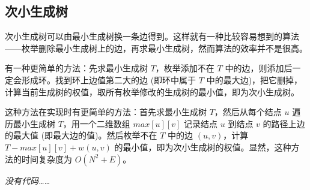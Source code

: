 \subsection{次小生成树}
	次小生成树可以由最小生成树换一条边得到。这样就有一种比较容易想到的算法------枚举删除最小生成树上的边，再求最小生成树，然而算法的效率并不是很高。
	
	有一种更简单的方法：先求最小生成树 $T$，枚举添加不在 $T$ 中的边，则添加后一定会形成环。找到环上边值第二大的边 (即环中属于 $T$ 中的最大边)，把它删掉，计算当前生成树的权值，取所有枚举修改的生成树的最小值，即为次小生成树。
	
	这种方法在实现时有更简单的方法：首先求最小生成树 $T$，然后从每个结点 $u$ 遍历最小生成树 $T$，用一个二维数组 $max[u][v]$ 记录结点 $u$ 到结点 $v$ 的路径上边的最大值 (即最大边的值)。然后枚举不在 $T$ 中的边 $(u,v)$，计算 $T-max[u][v]+w(u,v)$ 的最小值，即为次小生成树的权值。显然，这种方法的时间复杂度为 $O(N^{2}+E)$。
	
	\emph{没有代码……}